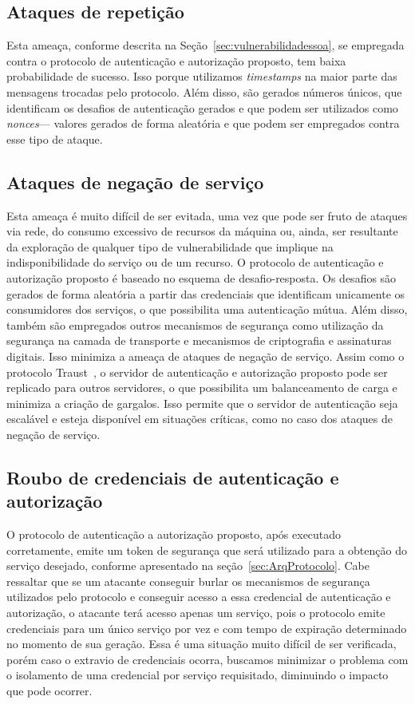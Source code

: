 \subsection{Ataques de repetição}

Esta ameaça, conforme descrita na Seção~\ref{sec:vulnerabilidadessoa}, se empregada contra o protocolo de autenticação e autorização proposto, tem baixa probabilidade de sucesso.
 Isso porque utilizamos \emph{timestamps} na maior parte das mensagens trocadas pelo protocolo. Além disso, são gerados números únicos, que identificam os desafios de autenticação gerados e que podem ser utilizados como \emph{nonces}--- valores gerados de forma aleat\'{o}ria e que podem ser empregados contra esse tipo de ataque.

\subsection{Ataques de negação de serviço}

Esta ameaça é muito difícil de ser evitada, uma vez que  pode ser fruto de ataques via rede, do consumo excessivo de recursos da máquina  ou, ainda, ser resultante da exploração de qualquer tipo de vulnerabilidade que implique na indisponibilidade do serviço ou de um recurso. O protocolo de autenticação e autorização proposto é baseado no esquema de desafio-resposta. Os desafios são gerados de forma aleatória a partir das credenciais que identificam unicamente os consumidores dos serviços, o que possibilita uma autenticação mútua. Além disso, também são empregados outros mecanismos de segurança como utilização da segurança na camada de transporte e mecanismos de criptografia e assinaturas digitais. Isso minimiza a ameaça de ataques de negação de serviço. Assim como o protocolo Traust~\cite{traust08}, o servidor de autenticação e autorização proposto pode ser replicado para outros servidores, o que possibilita um balanceamento de carga e minimiza a criação de gargalos. Isso permite que o servidor de autenticação seja escalável e esteja disponível em situações críticas, como no caso dos ataques de negação de serviço.


\subsection{Roubo de credenciais de autenticação e autorização}\label{subsec:RouboCred}

O protocolo de autenticação a autorização proposto, após executado corretamente, emite um token de segurança que será utilizado para a obtenção do serviço desejado, conforme
apresentado na seção~\ref{sec:ArqProtocolo}. Cabe ressaltar que se um atacante conseguir burlar os mecanismos de segurança utilizados pelo protocolo e conseguir acesso a essa credencial de autenticação e autorização, o atacante terá acesso apenas um serviço, pois o protocolo emite credenciais para um único serviço por vez e com tempo de expiração determinado no momento de sua geração. Essa é uma situação muito difícil de ser verificada, porém caso o extravio de credenciais ocorra, buscamos minimizar o problema com o
isolamento de uma credencial por servi\c co requisitado, diminuindo o impacto que pode ocorrer.


